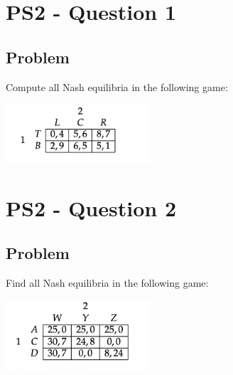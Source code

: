 \documentclass[10pt, a4paper]{article}
\begin{document}
\section*{PS2 - Question 1}
  \subsection*{Problem}
    Compute all Nash equilibria in the following game:
    \begin{center}
      \includegraphics[width = 0.4\textwidth]{PS2-1.png}
    \end{center}
\section*{PS2 - Question 2}
  \subsection*{Problem}
    Find all Nash equilibria in the following game: 
    \begin{center}
      \includegraphics[width=0.4\textwidth]{PS2-2.png}
    \end{center}
\end{document}
